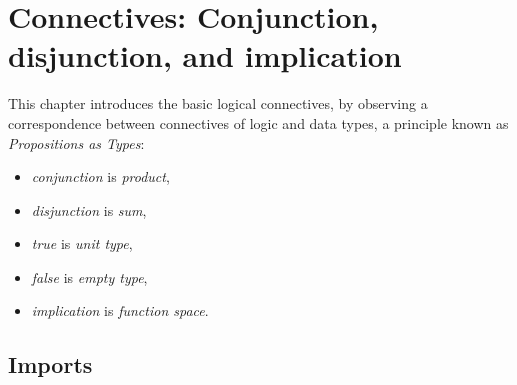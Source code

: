 \hypertarget{Connectives}{%
\chapter{Connectives: Conjunction, disjunction, and
implication}\label{Connectives}}

\begin{fence}
\begin{code}%
\>[0]\AgdaSpace{}%
\AgdaSpace{}%
\<%
\end{code}
\end{fence}

This chapter introduces the basic logical connectives, by observing a
correspondence between connectives of logic and data types, a principle
known as \emph{Propositions as Types}:

\begin{itemize}
\tightlist
\item
  \emph{conjunction} is \emph{product},
\item
  \emph{disjunction} is \emph{sum},
\item
  \emph{true} is \emph{unit type},
\item
  \emph{false} is \emph{empty type},
\item
  \emph{implication} is \emph{function space}.
\end{itemize}

\hypertarget{imports}{%
\section{Imports}\label{imports}}

